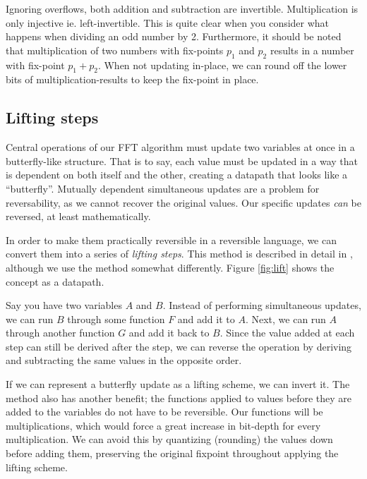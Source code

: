 Ignoring overflows, both addition and subtraction are invertible.
Multiplication is only injective ie. left-invertible.
This is quite clear when you consider what happens when dividing an odd number by 2.
Furthermore, it should be noted that multiplication of two numbers with fix-points $p_1$ and $p_2$
results in a number with fix-point $p_1 + p_2$.
When not updating in-place,
we can round off the lower bits of multiplication-results to keep the fix-point in place.

\subsection{Lifting steps}
Central operations of our FFT algorithm
must update two variables at once in a butterfly-like structure.
That is to say, each value must be updated in a way that is dependent on both itself and the other,
creating a datapath that looks like a ``butterfly''.
Mutually dependent simultaneous updates are a problem for reversability,
as we cannot recover the original values.
Our specific updates \textit{can} be reversed, at least mathematically.

In order to make them practically reversible in a reversible language,
we can convert them into a series of \textit{lifting steps}.
This method is described in detail in \cite{lifting1998},
although we use the method somewhat differently.
Figure \ref{fig:lift} shows the concept as a datapath.

Say you have two variables $A$ and $B$.
Instead of performing simultaneous updates,
we can run $B$ through some function $F$ and add it to $A$.
Next, we can run $A$ through another function $G$ and add it back to $B$.
Since the value added at each step can still be derived after the step,
we can reverse the operation by deriving and subtracting the same values in the opposite order.

If we can represent a butterfly update as a lifting scheme, we can invert it.
The method also has another benefit;
the functions applied to values before they are added to the variables do not have to be reversible.
Our functions will be multiplications,
which would force a great increase in bit-depth for every multiplication.
We can avoid this by quantizing (rounding) the values down before adding them,
preserving the original fixpoint throughout applying the lifting scheme.


